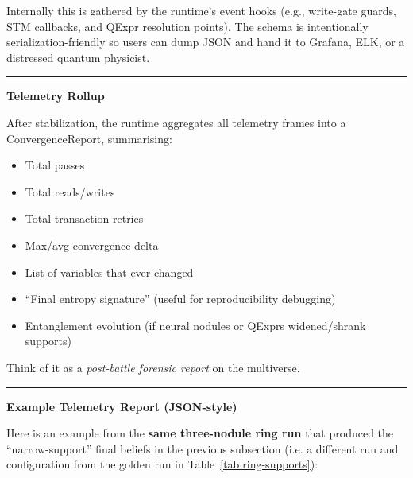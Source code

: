 \documentclass[a4paper,11pt]{article}
\begin{document}
Internally this is gathered by the runtime's event hooks (e.g., write-gate guards, STM callbacks, and QExpr resolution points). The schema is intentionally serialization-friendly so users can dump JSON and hand it to Grafana, ELK, or a distressed quantum physicist.

\begin{center}\rule{0.5\linewidth}{0.5pt}\end{center}

\textbf{Telemetry Rollup}

After stabilization, the runtime aggregates all telemetry frames into a ConvergenceReport, summarising:

\begin{itemize}
\item
  Total passes
\item
  Total reads/writes
\item
  Total transaction retries
\item
  Max/avg convergence delta
\item
  List of variables that ever changed
\item
  ``Final entropy signature'' (useful for reproducibility debugging)
\item
  Entanglement evolution (if neural nodules or QExprs widened/shrank supports)
\end{itemize}

Think of it as a \emph{post-battle forensic report} on the multiverse.

\begin{center}\rule{0.5\linewidth}{0.5pt}\end{center}

\textbf{Example Telemetry Report (JSON-style)}

Here is an example from the \textbf{same three-nodule ring run} that produced the
``narrow-support'' final beliefs in the previous subsection (i.e. a different run and
configuration from the golden run in Table~\ref{tab:ring-supports}):
\end{document}
